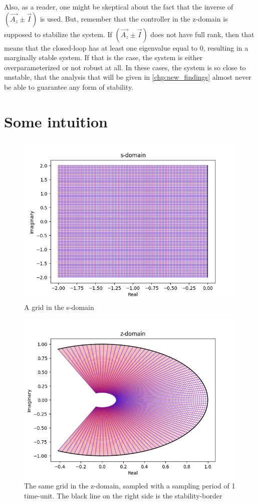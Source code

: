 Also, as a reader, one might be skeptical about the fact that the inverse of $\left( \Vec{A_z} \pm \Vec{I}\right)$ is used. But, remember that the controller in the z-domain is supposed to stabilize the system. If $\left( \Vec{A_z} \pm \Vec{I}\right)$ does not have full rank, then that means that the closed-loop has at least one eigenvalue equal to 0, resulting in a marginally stable system. If that is the case, the system is either overparameterized or not robust at all. In these cases, the system is so close to unstable, that the analysis that will be given in \cref{chp:new_findings} almost never be able to guarantee any form of stability. 

\section{Some intuition}
\begin{figure}
 
\includegraphics{Figures/s_grid.png}
 \caption{A grid in the s-domain}
 \label{fig:s_grid}
\end{figure}{}
\begin{figure}
 \centering
 \includegraphics{Figures/z_grid.png}
 \caption{The same grid in the z-domain, sampled with a sampling period of 1 time-unit. The black line on the right side is the stability-border}
 \label{fig:z_grid}
\end{figure}{}


